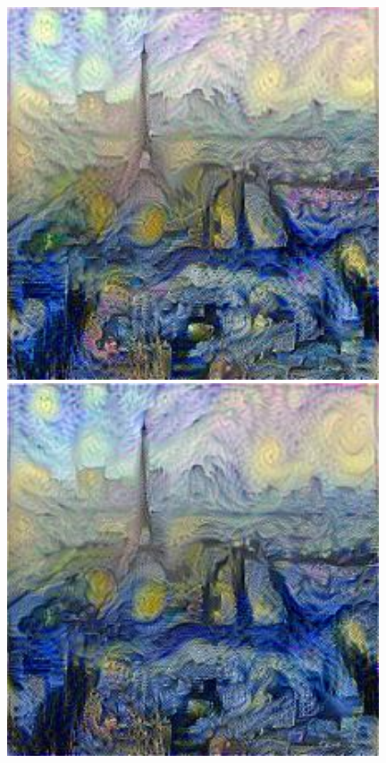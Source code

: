 \documentclass{article}
\begin{document}
\begin{figure}[!htb]
\begin{minipage}{0.2\textwidth}
\includegraphics[width=0.98\textwidth]{../Images/transfer/paris_starrynight_1e4_50.jpg}
\end{minipage}%
\begin{minipage}{0.2\textwidth}
\centering
\includegraphics[width=0.98\textwidth]{../Images/transfer/paris_starrynight_1e4_100.jpg}

\end{minipage}
\end{figure}
\end{document}
